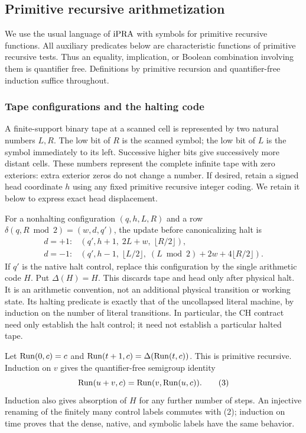 \subsection{Primitive recursive arithmetization}

We use the usual language of $\mathrm{iPRA}$ with symbols for primitive recursive
functions.  All auxiliary predicates below are characteristic functions of
primitive recursive tests.  Thus an equality, implication, or Boolean
combination involving them is quantifier free.  Definitions by primitive
recursion and quantifier-free induction suffice throughout.

\subsubsection{Tape configurations and the halting code}

A finite-support binary tape at a scanned cell is represented by two
natural numbers $L,R$.  The low bit of $R$ is the scanned symbol; the low bit
of $L$ is the symbol immediately to its left.  Successive higher bits give
successively more distant cells.  These numbers represent the complete
infinite tape with zero exteriors: extra exterior zeros do not change a
number.  If desired, retain a signed head coordinate $h$ using any fixed
primitive recursive integer coding.  We retain it below to express exact
head displacement.

For a nonhalting configuration $(q,h,L,R)$ and a row
$\delta(q,R\bmod 2)=(w,d,q')$, the update before canonicalizing halt is
\[
\begin{array}{ll}
d=+1:&(q',h+1,\;2L+w,\;\lfloor R/2\rfloor),\\[2pt]
d=-1:&(q',h-1,\;\lfloor L/2\rfloor,\;
       (L\bmod 2)+2w+4\lfloor R/2\rfloor).
\end{array}                                                    \tag{2}
\]
If $q'$ is the native halt control, replace this configuration by the single
arithmetic code $H$.  Put $\Delta(H)=H$.  This discards tape and head only
after physical halt.  It is an arithmetic convention, not an additional
physical transition or working state.  Its halting predicate is exactly
that of the uncollapsed literal machine, by induction on the number of
literal transitions.  In particular, the CH contract need only establish
the halt control; it need not establish a particular halted tape.

Let $\operatorname{Run}(0,c)=c$ and
$\operatorname{Run}(t+1,c)=\Delta(\operatorname{Run}(t,c))$.  This is primitive recursive.  Induction
on $v$ gives the quantifier-free semigroup identity
\[
 \operatorname{Run}(u+v,c)=\operatorname{Run}(v,\operatorname{Run}(u,c)).                                  \tag{3}
\]
Induction also gives absorption of $H$ for any further number of steps.
An injective renaming of the finitely many control labels commutes with
(2); induction on time proves that the dense, native, and symbolic labels
have the same behavior.

